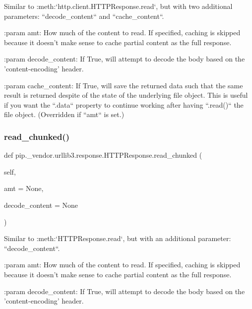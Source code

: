 \begin{DoxyVerb}Similar to :meth:`http.client.HTTPResponse.read`, but with two additional
parameters: ``decode_content`` and ``cache_content``.

:param amt:
    How much of the content to read. If specified, caching is skipped
    because it doesn't make sense to cache partial content as the full
    response.

:param decode_content:
    If True, will attempt to decode the body based on the
    'content-encoding' header.

:param cache_content:
    If True, will save the returned data such that the same result is
    returned despite of the state of the underlying file object. This
    is useful if you want the ``.data`` property to continue working
    after having ``.read()`` the file object. (Overridden if ``amt`` is
    set.)
\end{DoxyVerb}
 \mbox{\label{classpip_1_1__vendor_1_1urllib3_1_1response_1_1HTTPResponse_a4c7a442f95795a5db145a0680ffbd658}} 
\subsubsection{\texorpdfstring{read\+\_\+chunked()}{read\_chunked()}}
{\footnotesize\ttfamily def pip.\+\_\+vendor.\+urllib3.\+response.\+H\+T\+T\+P\+Response.\+read\+\_\+chunked (\begin{DoxyParamCaption}\item[{}]{self,  }\item[{}]{amt = {\ttfamily None},  }\item[{}]{decode\+\_\+content = {\ttfamily None} }\end{DoxyParamCaption})}

\begin{DoxyVerb}Similar to :meth:`HTTPResponse.read`, but with an additional
parameter: ``decode_content``.

:param amt:
    How much of the content to read. If specified, caching is skipped
    because it doesn't make sense to cache partial content as the full
    response.

:param decode_content:
    If True, will attempt to decode the body based on the
    'content-encoding' header.
\end{DoxyVerb}
 \mbox{\label{classpip_1_1__vendor_1_1urllib3_1_1response_1_1HTTPResponse_a339edb15d6f8153f013ca209e9e9b3f1}} 
